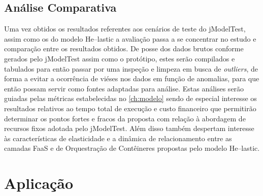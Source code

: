 \documentclass[english,brazilian]{UNISINOSmonografia} %
\begin{document}
\subsection{Análise Comparativa}


Uma vez obtidos os resultados referentes aos cenários de teste do jModelTest, assim como os do modelo \textsf{He}--lastic a avaliação passa a se concentrar no estudo e comparação entre os resultados obtidos.
%
De posse dos dados brutos conforme gerados pelo jModelTest assim como o protótipo, estes serão compilados e tabulados para então passar por uma inspeção e limpeza em busca de \textit{outliers}, de forma a evitar a ocorrência de viéses nos dados em função de anomalias, para que então possam servir como fontes adaptadas para análise.
%
Estas análises serão guiadas pelas métricas estabelecidas no \autoref{ch:modelo} sendo de especial interesse os resultados relativos ao tempo total de execução e custo financeiro que permitirão determinar os pontos fortes e fracos da proposta com relação à abordagem de recursos fixos adotada pelo jModelTest.
%
Além disso também despertam interesse às características de elasticidade e a dinâmica de relacionamento entre as camadas FaaS e de Orquestração de Contêineres propostas pelo modelo \textsf{He}--lastic.







\section{Aplicação}
\end{document}
